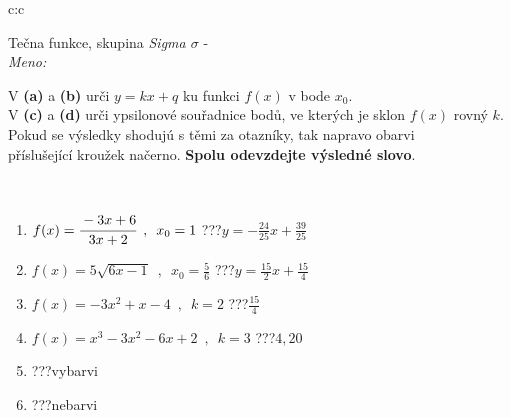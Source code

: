 \documentclass[10pt]{report}
\begin{document}
\newpage
\thispagestyle{empty}
\begin{tabular}{c:c}
\begin{minipage}[c][104.5mm][t]{0.5\linewidth}
\begin{center}
\vspace{7mm}
{\huge Tečna funkce, skupina \textit{Sigma $\sigma$} -}\\[5mm]
\textit{Meno:}\phantom{xxxxxxxxxxxxxxxxxxxxxxxxxxxxxxxxxxxxxxxxxxxxxxxxxxxxxxxxxxxxxxxxx}\\[5mm]
\begin{minipage}{0.95\linewidth}
\begin{center}
V \textbf{(a)} a \textbf{(b)} urči  $y = kx + q$ ku funkci $f(x)$ v bode $x_0$.\\V \textbf{(c)} a \textbf{(d)} urči ypsilonové souřadnice bodů, ve kterých je sklon $f(x)$ rovný $k$.\\Pokud se výsledky shodujú s těmi za otazníky, tak napravo obarvi\\příslušející kroužek načerno. \textbf{Spolu odevzdejte výsledné slovo}.
\end{center}
\end{minipage}
\\[1mm]
\begin{minipage}{0.79\linewidth}
\begin{center}
\begin{varwidth}{\linewidth}
\begin{enumerate}
\small
\item $f(x)=\cfrac{-3x+6}{3x+2}\enspace , \enspace x_0=1$\quad \dotfill\; ???\;\dotfill \quad $y = -\frac{24}{25}x+\frac{39}{25}$
\item $f(x)=5\sqrt{6x-1}\enspace , \enspace x_0=\frac{5}{6}$\quad \dotfill\; ???\;\dotfill \quad $y = \frac{15}{2}x+\frac{15}{4}$
\item $f(x)=-3x^2+x-4\enspace , \enspace k=2$\quad \dotfill\; ???\;\dotfill \quad $\frac{15}{4}$
\item $f(x)=x^3-3x^2-6x+2\enspace , \enspace k=3$\quad \dotfill\; ???\;\dotfill \quad $4 , 20$
\item \quad \dotfill\; ???\;\dotfill \quad vybarvi
\item \quad \dotfill\; ???\;\dotfill \quad nebarvi
\end{enumerate}
\end{varwidth}
\end{center}
\end{minipage}
\begin{minipage}{0.20\linewidth}

\end{minipage}
\end{center}
\end{minipage}
\end{tabular}
\end{document}
